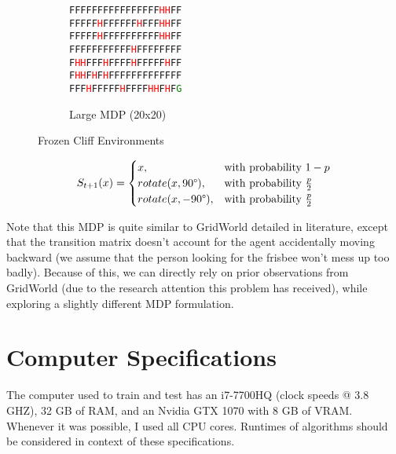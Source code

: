 \documentclass[letter]{article}
\begin{document}
\begin{figure}
\begin{subfigure}{.5\textwidth}
      \texttt{FFFFFFFFFFFFFFFF\textcolor{red}{H}\textcolor{red}{H}FF}\\
      \texttt{FFFFF\textcolor{red}{H}FFFFFF\textcolor{red}{H}FFF\textcolor{red}{H}\textcolor{red}{H}FF}\\
      \texttt{FFFFF\textcolor{red}{H}FFFFFFFFFF\textcolor{red}{H}\textcolor{red}{H}FF}\\
      \texttt{FFFFFFFFFFF\textcolor{red}{H}FFFFFFFF}\\
      \texttt{F\textcolor{red}{H}\textcolor{red}{H}FFF\textcolor{red}{H}FFFF\textcolor{red}{H}FFFFF\textcolor{red}{H}FF}\\
      \texttt{F\textcolor{red}{H}\textcolor{red}{H}F\textcolor{red}{H}F\textcolor{red}{H}FFFFFFFFFFFFF}\\
      \texttt{FFF\textcolor{red}{H}FFFFF\textcolor{red}{H}FFFF\textcolor{red}{H}\textcolor{red}{H}F\textcolor{red}{H}F\textcolor{green}{G}}      
      \caption{Large MDP (20x20)}
      \label{fig1:largemdp}
    \end{subfigure}
    \caption{Frozen Cliff Environments}
\end{figure}
    

\begin{equation}
    \label{eq:mdptransition}
    S_{t+1}(x) = 
    \begin{cases}
        x,& \text{with probability } 1-p\\
        rotate(x, 90\degree),              & \text{with probability } \frac{p}{2}\\
        rotate(x, -90\degree),              & \text{with probability } \frac{p}{2}
    \end{cases}
\end{equation}

Note that this MDP is quite similar to GridWorld detailed in literature, except that the transition matrix doesn't account for the agent accidentally moving backward (we assume that the person looking for the frisbee won't mess up too badly). Because of this, we can directly rely on prior observations from GridWorld (due to the research attention this problem has received), while exploring a slightly different MDP formulation.

\section{Computer Specifications}
The computer used to train and test has an i7-7700HQ (clock speeds @ 3.8 GHZ), 32 GB of RAM, and an Nvidia GTX 1070 with 8 GB of VRAM. Whenever it was possible, I used all CPU cores. Runtimes of algorithms should be considered in context of these specifications.
\end{document}
